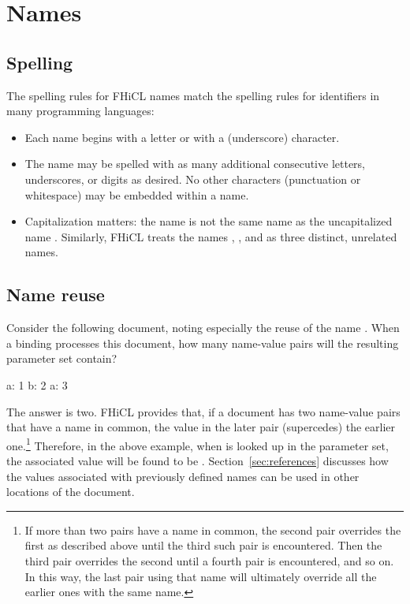 \documentclass[draftmode,draftwater]{memarticle}
\newcommand{\fhicl}{FHiCL\xspace}
\begin{document}
\chapter{Names}

\section{Spelling}

The spelling rules for \fhicl names match the spelling rules for
identifiers in many programming languages:
\begin{itemize}
\item Each name begins with a letter or with a \fclcode{_}
  (underscore) character.
\item The name may be spelled with as many additional consecutive
  letters, underscores, or digits as desired.  No other characters
  (\eg punctuation or whitespace) may be embedded within a name.
\item Capitalization matters: the name  is not the same
  name as the uncapitalized name .  Similarly, \fhicl
  treats the names , , and
   as three distinct, unrelated names.
\end{itemize}%

\section{Name reuse}

Consider the following document, noting especially the reuse of the
name .  When a binding processes this document, how many
name-value pairs will the resulting parameter set contain?
%
\Needspace{0.5in}
\begin{fcllisting}[texcl,escapechar=`]
a: 1
b: 2
a: 3
\end{fcllisting}
%
The answer is two.  \fhicl provides that, if a document has two
name-value pairs that have a name in common, the value in the later
pair  (supercedes) the earlier one.\footnote{%
  If more than two pairs have a name in common, the second pair
  overrides the first as described above until the third such pair is
  encountered.  Then the third pair overrides the second until a
  fourth pair is encountered, and so on.  In this way, the last pair
  using that name will ultimately override all the earlier ones with
  the same name.%
} Therefore, in the above example, when  is looked up in
the parameter set, the associated value will be found to be
.  Section~\ref{sec:references} discusses how the values
associated with previously defined names can be used in other
locations of the document.
\end{document}
